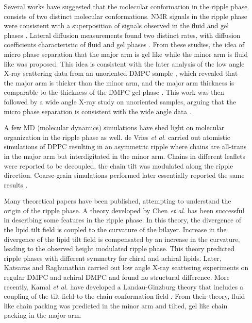 Several works have suggested that the molecular conformation in the ripple phase 
consists of two distinct molecular conformations. 
NMR signals in the ripple phase were consistent
with a superposition of signals observed in the fluid and gel phases
\cite{ref:Wittebort81}.
Lateral diffusion measurements found two distinct rates,
with diffusion coefficients characteristic of fluid and gel phases
\cite{ref:Schneider83}. 
From these studies, the idea of micro phase separation that the major arm
is gel like while the minor arm is fluid like was proposed.
This idea is consistent with the later analysis \cite{ref:Sun96} 
of the low angle X-ray scattering 
data from an unoriented DMPC sample \cite{ref:Wack89}, which revealed that 
the major arm is thicker than the minor arm, and 
the major arm thickness is comparable to the thickness of the DMPC gel phase
\cite{ref:Sun96}.
This work was then followed by a wide angle X-ray study on
unoriented samples, arguing that the micro phase separation is consistent 
with the wide angle data \cite{ref:Cunningham98}.

A few MD (molecular dynamics) simulations have shed light on molecular 
organization in the ripple phase as well. 
de Vries \textit{et al.} \cite{ref:deVries05}
carried out atomistic simulations of DPPC resulting in an
asymmetric ripple where chains are all-trans in the major arm but
interdigitated in the minor arm. Chains in different leaflets
were reported to be decoupled, the chain tilt was modulated 
along the ripple direction.
Coarse-grain simulations performed later essentially reported the same results
\cite{ref:Lenz07}.

Many theoretical papers have been published, attempting to understand
the origin of the ripple phase.
A theory developed by Chen \textit{et al.} \cite{ref:Chen95} has been 
successful in describing some features in the ripple phase. In this theory,
the divergence of the lipid tilt field is coupled to the curvature 
of the bilayer. Increase in the divergence of the lipid tilt field is compensated 
by an increase in the curvature, leading to the observed height modulated
ripple phase. This theory predicted ripple phases with different symmetry
for chiral and achiral lipids. Later, Katsaras and Raghunathan 
\cite{ref:Katsaras95} carried out low angle X-ray scattering experiments
on regular DMPC and achiral DMPC and found no structural difference. 
More recently, Kamal \textit{et al.} have developed a Landau-Ginzburg theory
that includes a coupling of the tilt field to the chain conformation field
\cite{ref:Kamal11}.
From their theory, fluid like chain packing was predicted in the minor
arm and tilted, gel like chain packing in the major arm.


